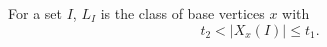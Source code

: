 \begin{definition}
For a set \(I\), \(L_I\) is the class of base vertices \(x\) with
\[
t_2<|X_x(I)|\le t_1.
\]
\end{definition}
